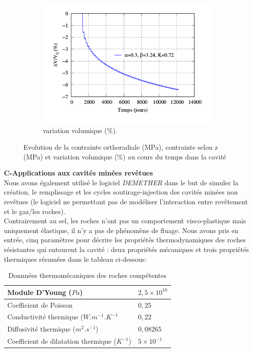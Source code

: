 \documentclass[11pt,french,a4paper]{article}
\begin{document}
\begin{figure}[h!]
\begin{subfigure}[b]{0.3\linewidth}
    \includegraphics[width=\linewidth]{image/chap2/Volume1.png}
    \caption{variation volumique (\%).}
\end{subfigure}

\caption{Evolution de la  contrainte orthoradiale (MPa), contrainte selon z (MPa) et variation volumique (\%) au cours du temps dans la cavité}
\label{fig:7 figures}
\end{figure}

\textbf{C-Applications aux cavités minées revêtues}\\

Nous avons également utilisé le logiciel \emph{DEMETHER} dans le but de simuler la création, le remplissage et les cycles soutirage-injection des cavités minées non revêtues (le logiciel ne permettant pas de modéliser l’interaction entre revêtement et le gaz/les roches).\\

Contrairement au sel, les roches n’ont pas un comportement visco-plastique mais uniquement élastique, il n’y a pas de phénomène de fluage. Nous avons pris en entrée, cinq paramètres pour décrire les propriétés thermodynamiques des roches résistantes qui entourent la cavité : deux propriétés mécaniques et trois propriétés thermiques résumées dans le tableau ci-dessous:\\


\begin{table}[h]
\centering
\begin{tabular}{|l|l|}
\hline
Module D'Young ($Pa$) & $2,5\times 10^{10}$ \\
\hline
Coefficient de Poisson & $0,25$ \\
\hline
Conductivité thermique ($W.m^{-1}.K^{-1}$ & $0,22$ \\
\hline
Diffusivité thermique ($m^2.s^{-1}$) & $0,08265$ \\
\hline
Coefficient de dilatation thermique ($K^{-1}$) & $5\times 10^{-1}$ \\
\hline
\end{tabular}
\caption{Donnnées thermomécaniques des roches compétentes}
\end{table}
\end{document}
